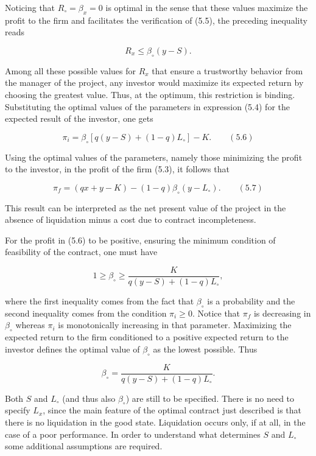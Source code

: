 \documentclass[11pt,a4paper]{article}
\begin{document}
Noticing that \(R_\circ = \beta_x = 0\) is optimal in the sense that these values maximize the
profit to the firm and facilitates the verification of (5.5), the preceding inequality reads

\[R_x \leq \beta_\circ(y - S).\]

Among all these possible values for \(R_x\) that ensure a trustworthy behavior from the manager of
the project, any investor would maximize its expected return by choosing the greatest value. Thus,
at the optimum, this restriction is binding. Substituting the optimal values of the parameters in
expression (5.4) for the expected result of the investor, one gets

\[\pi_i = \beta_\circ[q(y - S) + (1 - q)L_\circ] - K. \qquad (5.6)\]

Using the optimal values of the parameters, namely those minimizing the profit to the investor, in
the profit of the firm (5.3), it follows that

\[\pi_f = (qx + y - K) - (1 - q)\beta_\circ(y - L_\circ). \qquad (5.7)\]

This result can be interpreted as the net present value of the project in the absence of liquidation
minus a cost due to contract incompleteness.

For the profit in (5.6) to be positive, ensuring the minimum condition of feasibility of the
contract, one must have

\[1 \geq \beta_\circ \geq \frac{K}{q(y - S) + (1 - q)L_\circ},\]

where the first inequality comes from the fact that \(\beta_\circ\) is a probability and the second
inequality comes from the condition \(\pi_i \geq 0\). Notice that \(\pi_f\) is decreasing in
\(\beta_\circ\) whereas \(\pi_i\) is monotonically increasing in that parameter. Maximizing the
expected return to the firm conditioned to a positive expected return to the investor defines the
optimal value of \(\beta_\circ\) as the lowest possible. Thus

\[\beta_\circ = \frac{K}{q(y - S) + (1 - q)L_\circ}.\]

Both \(S\) and \(L_\circ\) (and thus also \(\beta_\circ\)) are still to be specified. There is no
need to specify \(L_x\), since the main feature of the optimal contract just described is that there
is no liquidation in the good state. Liquidation occurs only, if at all, in the case of a poor
performance. In order to understand what determines \(S\) and \(L_\circ\) some additional
assumptions are required.
\end{document}

